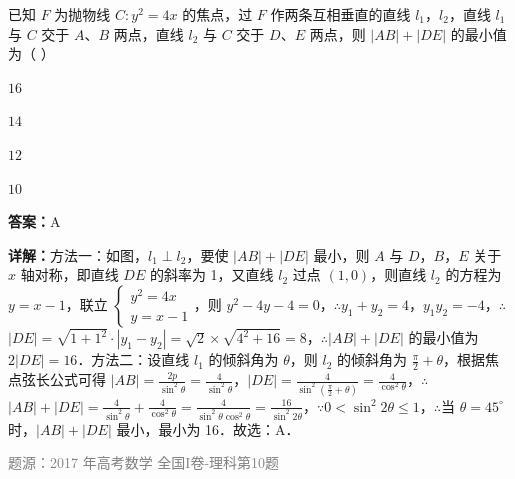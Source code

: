 \begin{question}
已知 $F$ 为抛物线 $C:y^2=4x$ 的焦点，过 $F$ 作两条互相垂直的直线 $l_1$，$l_2$，直线 $l_1$ 与 $C$ 交于 $A$、$B$ 两点，直线 $l_2$ 与 $C$ 交于 $D$、$E$ 两点，则 $|AB|+|DE|$ 的最小值为（ ）
\begin{choices}
\item $16$
\item $14$
\item $12$
\item $10$
\end{choices}
\begin{solution}
\textbf{答案：}A

\textbf{详解：}方法一：如图，$l_1\perp l_2$，要使 $|AB|+|DE|$ 最小，则 $A$ 与 $D$，$B$，$E$ 关于 $x$ 轴对称，即直线 $DE$ 的斜率为 1，又直线 $l_2$ 过点 $(1,0)$，则直线 $l_2$ 的方程为 $y=x-1$，联立 $\begin{cases} y^2=4x \\ y=x-1 \end{cases}$，则 $y^2-4y-4=0$，\ensuremath{\therefore}$y_1+y_2=4$，$y_1y_2=-4$，\ensuremath{\therefore}$|DE|=\sqrt{1+1^2}\cdot|y_1-y_2|=\sqrt{2}\times\sqrt{4^2+16}=8$，\ensuremath{\therefore}$|AB|+|DE|$ 的最小值为 $2|DE|=16$．方法二：设直线 $l_1$ 的倾斜角为 $\theta$，则 $l_2$ 的倾斜角为 $\frac{\pi}{2}+\theta$，根据焦点弦长公式可得 $|AB|=\frac{2p}{\sin^2\theta}=\frac{4}{\sin^2\theta}$，$|DE|=\frac{4}{\sin^2(\frac{\pi}{2}+\theta)}=\frac{4}{\cos^2\theta}$，\ensuremath{\therefore}$|AB|+|DE|=\frac{4}{\sin^2\theta}+\frac{4}{\cos^2\theta}=\frac{4}{\sin^2\theta\cos^2\theta}=\frac{16}{\sin^2 2\theta}$，\ensuremath{\because}$0<\sin^2 2\theta\leq 1$，\ensuremath{\therefore}当 $\theta=45^\circ$ 时，$|AB|+|DE|$ 最小，最小为 16．故选：A．

\textcolor{gray}{\footnotesize 题源：2017 年高考数学 全国I卷-理科第10题}
\end{solution}
\end{question}

